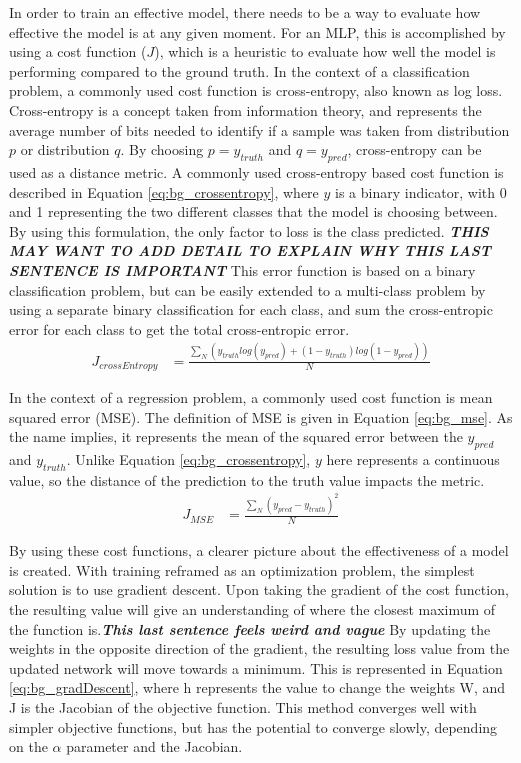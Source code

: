 	\par In order to train an effective model, there needs to be a way to evaluate how effective the model is at any given moment. For an MLP, this is accomplished by using a cost function ($J$), which is a heuristic to evaluate how well the model is performing compared to the ground truth. In the context of a classification problem, a commonly used cost function is cross-entropy, also known as log loss. Cross-entropy is a concept taken from information theory, and represents the average number of bits needed to identify if a sample was taken from distribution $p$ or distribution $q$. By choosing $p=y_{truth}$ and $q=y_{pred}$, cross-entropy can be used as a distance metric. A commonly used cross-entropy based cost function is described in Equation \ref{eq:bg_crossentropy}, where $y$ is a binary indicator, with 0 and 1 representing the two different classes that the model is choosing between. By using this formulation, the only factor to loss is the class predicted. \textbf{\textit{THIS MAY WANT TO ADD DETAIL TO EXPLAIN WHY THIS LAST SENTENCE IS IMPORTANT}} This error function is based on a binary classification problem, but can be easily extended to a multi-class problem by using a separate binary classification for each class, and sum the cross-entropic error for each class to get the total cross-entropic error.  
	\begin{align}
		J_{crossEntropy} &= \frac{\sum_N (y_{truth}log(y_{pred}) + (1-y_{truth})log(1-y_{pred})) }{N} \label{eq:bg_crossentropy}
	\end{align}
	\par In the context of a regression problem, a commonly used cost function is mean squared error (MSE). The definition of MSE is given in Equation \ref{eq:bg_mse}. As the name implies, it represents the mean of the squared error between the $y_{pred}$ and $y_{truth}$. Unlike Equation \ref{eq:bg_crossentropy}, $y$ here represents a continuous value, so the distance of the prediction to the truth value impacts the metric. 
	\begin{align}
		J_{MSE} &= \frac{\sum_N (y_{pred}-y_{truth})^2}{N} \label{eq:bg_mse}
	\end{align}
	\par By using these cost functions, a clearer picture about the effectiveness of a model is created. With training reframed as an optimization problem, the simplest solution is to use gradient descent. Upon taking the gradient of the cost function, the resulting value will give an understanding of where the closest maximum of the function is.\textbf{\textit{This last sentence feels weird and vague}} By updating the weights in the opposite direction of the gradient, the resulting loss value from the updated network will move towards a minimum. This is represented in Equation \ref{eq:bg_gradDescent}, where h represents the value to change the weights W, and J is the Jacobian of the objective function. This method converges well with simpler objective functions, but has the potential to converge slowly, depending on the $\alpha$ parameter and the Jacobian.
